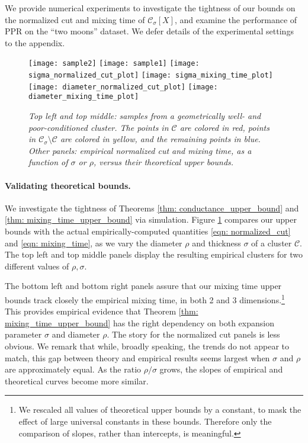 \documentclass[11pt,twoside]{article}
\newcommand{\1}{\mathbbm{1}}
\newcommand{\Xbf}{X}
\newcommand{\Cset}{\mathcal{C}}
\newcommand{\Csig}{\Cset_{\sigma}}
\begin{document}
We provide numerical experiments to investigate the tightness of our bounds on
the normalized cut and mixing time of $\Csig[\Xbf]$, and examine the performance
of PPR on the ``two moons'' dataset. We defer details of the experimental
settings to the appendix.   

\begin{figure}[tb]
  \centering
  \texttt{[image: sample2]}
  \texttt{[image: sample1]}
  \texttt{[image: sigma\_normalized\_cut\_plot]}
  \texttt{[image: sigma\_mixing\_time\_plot]}
  \texttt{[image: diameter\_normalized\_cut\_plot]}
  \texttt{[image: diameter\_mixing\_time\_plot]}
  \caption{\it\small Top left and top middle: samples from a geometrically
    well- and poor-conditioned cluster. The points in $\Cset$ are colored in 
    red, points in $\Csig \setminus \Cset$ are colored in yellow, and the
    remaining points in blue. Other panels: empirical normalized cut and mixing
    time, as a function of $\sigma$ or $\rho$, versus their theoretical upper
    bounds.} 
  \label{fig:bounds}
\end{figure}

\paragraph{Validating theoretical bounds.}  We investigate the tightness of
Theorems \ref{thm: conductance_upper_bound} and \ref{thm:
  mixing_time_upper_bound} via simulation. Figure \ref{fig:bounds} compares our
upper bounds with the actual empirically-computed quantities \eqref{eqn:
  normalized_cut} and \eqref{eqn: mixing_time}, as we vary the diameter $\rho$
and thickness $\sigma$ of a cluster $\Cset$. The top left and top middle panels
display the resulting empirical clusters for two different values of
$\rho,\sigma$. 

The bottom left and bottom right panels assure that our mixing  
time upper bounds track closely the empirical mixing time, in both 2 and 3 
dimensions.\footnote{We rescaled all values of theoretical upper
  bounds by a constant, to mask the effect of large universal constants
  in these bounds. Therefore only the comparison of slopes, rather than
  intercepts, is meaningful.} This provides empirical evidence that Theorem
\ref{thm: mixing_time_upper_bound} has the right dependency on both expansion
parameter $\sigma$ and diameter $\rho$. The story for the normalized cut panels
is less obvious. We remark that while, broadly speaking, the trends do not
appear to match, this gap between theory and empirical results seems largest
when $\sigma $ and $\rho$ are approximately equal. As the ratio $\rho/\sigma$
grows, the slopes of empirical and theoretical curves become more similar.
\end{document}
